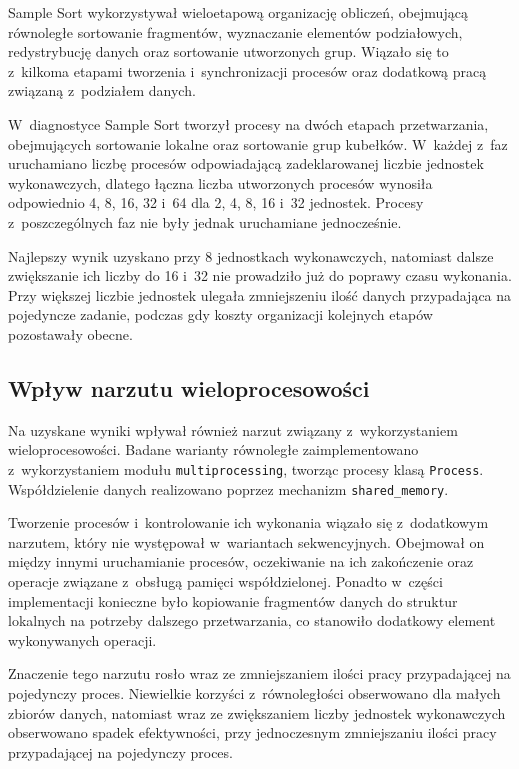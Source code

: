 Sample Sort wykorzystywał wieloetapową organizację obliczeń, obejmującą równoległe sortowanie fragmentów, 
wyznaczanie elementów podziałowych, redystrybucję danych oraz sortowanie utworzonych grup. 
Wiązało się to z~kilkoma etapami tworzenia i~synchronizacji procesów oraz dodatkową pracą związaną z~podziałem danych.

W~diagnostyce Sample Sort tworzył procesy na dwóch etapach przetwarzania, obejmujących sortowanie lokalne oraz sortowanie grup kubełków.
W~każdej z~faz uruchamiano liczbę procesów odpowiadającą zadeklarowanej liczbie jednostek wykonawczych, 
dlatego łączna liczba utworzonych procesów wynosiła odpowiednio 4, 8, 16, 32 i~64 dla 2, 4, 8, 16 i~32 jednostek. 
Procesy z~poszczególnych faz nie były jednak uruchamiane jednocześnie.

Najlepszy wynik uzyskano przy 8 jednostkach wykonawczych, natomiast dalsze zwiększanie ich liczby do 16 i~32 nie prowadziło już do poprawy czasu wykonania.
Przy większej liczbie jednostek ulegała zmniejszeniu ilość danych przypadająca na pojedyncze zadanie, 
podczas gdy koszty organizacji kolejnych etapów pozostawały obecne.

\subsection*{Wpływ narzutu wieloprocesowości}

Na uzyskane wyniki wpływał również narzut związany z~wykorzystaniem wieloprocesowości. 
Badane warianty równoległe zaimplementowano z~wykorzystaniem modułu \texttt{multiprocessing}, tworząc procesy klasą \texttt{Process}. 
Współdzielenie danych realizowano poprzez mechanizm \texttt{shared\_memory}.

Tworzenie procesów i~kontrolowanie ich wykonania wiązało się z~dodatkowym narzutem, który nie występował w~wariantach sekwencyjnych. 
Obejmował on między innymi uruchamianie procesów, oczekiwanie na ich zakończenie oraz operacje związane z~obsługą pamięci współdzielonej.
Ponadto w~części implementacji konieczne było kopiowanie fragmentów danych do struktur 
lokalnych na potrzeby dalszego przetwarzania, co stanowiło dodatkowy element wykonywanych operacji.

Znaczenie tego narzutu rosło wraz ze zmniejszaniem ilości pracy przypadającej na pojedynczy proces. 
Niewielkie korzyści z~równoległości obserwowano dla małych zbiorów danych,
natomiast wraz ze zwiększaniem liczby jednostek wykonawczych obserwowano spadek efektywności,
przy jednoczesnym zmniejszaniu ilości pracy przypadającej na pojedynczy proces.

